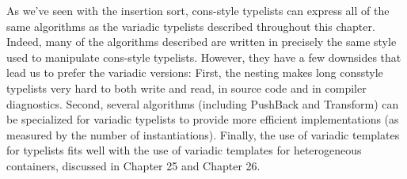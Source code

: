 As we’ve seen with the insertion sort, cons-style typelists can express all of the same algorithms as the variadic typelists described throughout this chapter. Indeed, many of the algorithms described are written in precisely the same style used to manipulate cons-style typelists. However, they have a few downsides that lead us to prefer the variadic versions: First, the nesting makes long consstyle typelists very hard to both write and read, in source code and in compiler diagnostics. Second, several algorithms (including PushBack and Transform) can be specialized for variadic typelists to provide more efficient implementations (as measured by the number of instantiations). Finally, the use of variadic templates for typelists fits well with the use of variadic templates for heterogeneous containers, discussed in Chapter 25 and Chapter 26.





















